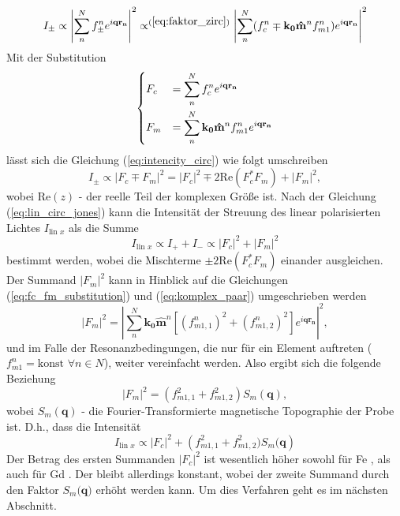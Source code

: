 \begin{equation}
    I_{\pm} \propto \left| \sum_{n}^N f_{\pm}^n e^{i\mathbf{qr_n}} \right|^2 \propto^{(\ref{eq:faktor_zirc})} \left| \sum_{n}^N (f_{c}^n\mp \mathbf{k_0}\mathbf{\hat{m}}^n f_{m1}^n) e^{i\mathbf{qr_n}} \right|^2
    \label{eq:intencity_circ}
\end{equation}
Mit der Substitution
\begin{equation}
    \begin{dcases}
     F_c &= \sum^N_n f_c^n e^{i\mathbf{qr_n}}\\
     F_m &= \sum^N_n \mathbf{k_0}\mathbf{\hat{m}}^n f_{m1}^n e^{i\mathbf{qr_n}}
    \end{dcases}
    \label{eq:fc_fm_substitution}
\end{equation}
lässt sich die Gleichung (\ref{eq:intencity_circ}) wie folgt umschreiben
\begin{equation}
     I_{\pm} \propto \left| F_c \mp F_m \right|^2 = \left| F_c \right|^2 \mp 2\text{Re}(F_c^*F_m) + \left| F_m \right|^2,
\end{equation}
wobei $\text{Re}(z)$ - der reelle Teil der komplexen Größe ist. Nach der Gleichung (\ref{eq:lin_circ_jones}) kann die Intensität der Streuung des linear polarisierten Lichtes $I_{\text{lin $x$}}$ als die Summe
\begin{equation}
    I_{\text{lin $x$}} \propto I_+ + I_- \propto  \left| F_c \right|^2 + \left| F_m \right|^2
\end{equation}
bestimmt werden, wobei die Mischterme $\pm2\text{Re}(F_c^*F_m)$ einander ausgleichen. Der Summand $\left|F_m\right|^2$ kann in Hinblick auf die Gleichungen (\ref{eq:fc_fm_substitution}) und (\ref{eq:komplex_paar}) umgeschrieben werden
\begin{equation}
    \left|F_m\right|^2 =  \left|\sum^N_n \mathbf{k_0}\mathbf{\hat{m}}^n \left[(f_{m1,1}^n)^2 + (f_{m1,2}^n)^2\right] e^{i\mathbf{qr_n}}\right|^2,
\end{equation}
und im Falle der Resonanzbedingungen, die nur für ein Element auftreten ($f_{m1}^n = \text{konst } \forall n \in N$), weiter vereinfacht werden. Also ergibt sich die folgende Beziehung
\begin{equation}
   \left|F_m\right|^2 = (f_{m1,1}^2 + f_{m1,2}^2)S_m(\mathbf{q}),
\end{equation}
wobei $S_m(\mathbf{q})$ - die Fourier-Transformierte magnetische Topographie der Probe ist. D.h., dass die Intensität 
\begin{equation}
    I_{\text{lin $x$}} \propto  \left| F_c \right|^2 + \left(f_{m1,1}^2 + f_{m1,2}^2)S_m(\mathbf{q}\right)
\end{equation}
Der Betrag des ersten Summanden $\left|F_c\right|^2$ ist wesentlich höher sowohl für Fe \cite[Abb. 7]{kortright_resonant_2013}, als auch für Gd \cite[Abb. 5]{peters_soft_2004}. Der bleibt allerdings konstant, wobei der zweite Summand durch den Faktor $S_m(\mathbf{q)}$ erhöht werden kann. Um dies Verfahren geht es im nächsten Abschnitt.

